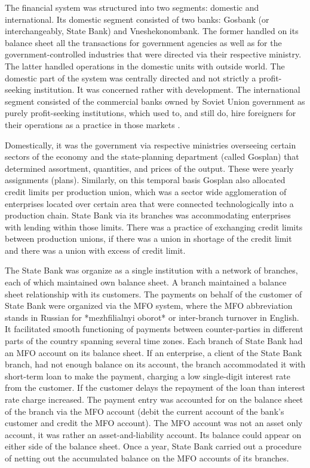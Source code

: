 The financial system was structured into two segments: domestic and
international. Its domestic segment consisted of two banks: Gosbank (or
interchangeably, State Bank) and Vneshekonombank. The former handled on
its balance sheet all the transactions for government agencies as well
as for the government-controlled industries that were directed via their
respective ministry. The latter handled operations in the domestic units
with outside world. The domestic part of the system was centrally
directed and not strictly a profit-seeking institution. It was concerned
rather with development. The international segment consisted of the
commercial banks owned by Soviet Union government as purely
profit-seeking institutions, which used to, and still do, hire
foreigners for their operations as a practice in those markets \citep{krotov2007,krotov2011}.

Domestically, it was the government via respective ministries overseeing
certain sectors of the economy and the state-planning department (called
Gosplan) that determined assortment, quantities, and prices of the
output. These were yearly assignments (plans). Similarly, on this
temporal basis Gosplan also allocated credit limits per production
union, which was a sector wide agglomeration of enterprises located over
certain area that were connected technologically into a production
chain. State Bank via its branches was accommodating enterprises with
lending within those limits. There was a practice of exchanging credit
limits between production unions, if there was a union in shortage of
the credit limit and there was a union with excess of credit limit.

The State Bank was organize as a single institution with a network of
branches, each of which maintained own balance sheet. A branch
maintained a balance sheet relationship with its customers. The payments
on behalf of the customer of State Bank were organized via the MFO
system, where the MFO abbreviation stands in Russian for *mezhfilialnyi
oborot* or inter-branch turnover in English. It facilitated smooth
functioning of payments between counter-parties in different parts of
the country spanning several time zones. Each branch of State Bank had
an MFO account on its balance sheet. If an enterprise, a client of the
State Bank branch, had not enough balance on its account, the branch
accommodated it with short-term loan to make the payment, charging a low
single-digit interest rate from the customer. If the customer delays the
repayment of the loan than interest rate charge increased. The payment
entry was accounted for on the balance sheet of the branch via the MFO
account (debit the current account of the bank's customer and credit the
MFO account). The MFO account was not an asset only account, it was
rather an asset-and-liability account. Its balance could appear on
either side of the balance sheet. Once a year, State Bank carried out a
procedure of netting out the accumulated balance on the MFO accounts of
its branches.

